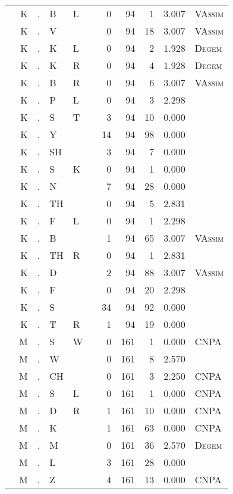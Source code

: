 \begin{longtable}{r@{ } r@{ } c@{ } l@{ } l@{ } l@{ } r r r r l }
 & K & . & B & L &  & 0 & 94 & 1 & 3.007 & \textsc{VAssim} \\
 & K & . & V &  &  & 0 & 94 & 18 & 3.007 & \textsc{VAssim} \\
 & K & . & K & L &  & 0 & 94 & 2 & 1.928 & \textsc{Degem} \\
 & K & . & K & R &  & 0 & 94 & 4 & 1.928 & \textsc{Degem} \\
 & K & . & B & R &  & 0 & 94 & 6 & 3.007 & \textsc{VAssim} \\
 & K & . & P & L &  & 0 & 94 & 3 & 2.298 &  \\
 & K & . & S & T &  & 3 & 94 & 10 & 0.000 &  \\
 & K & . & Y &  &  & 14 & 94 & 98 & 0.000 &  \\
 & K & . & SH &  &  & 3 & 94 & 7 & 0.000 &  \\
 & K & . & S & K &  & 0 & 94 & 1 & 0.000 &  \\
 & K & . & N &  &  & 7 & 94 & 28 & 0.000 &  \\
 & K & . & TH &  &  & 0 & 94 & 5 & 2.831 &  \\
 & K & . & F & L &  & 0 & 94 & 1 & 2.298 &  \\
 & K & . & B &  &  & 1 & 94 & 65 & 3.007 & \textsc{VAssim} \\
 & K & . & TH & R &  & 0 & 94 & 1 & 2.831 &  \\
 & K & . & D &  &  & 2 & 94 & 88 & 3.007 & \textsc{VAssim} \\
 & K & . & F &  &  & 0 & 94 & 20 & 2.298 &  \\
 & K & . & S &  &  & 34 & 94 & 92 & 0.000 &  \\
 & K & . & T & R &  & 1 & 94 & 19 & 0.000 &  \\
 & M & . & S & W &  & 0 & 161 & 1 & 0.000 & \textsc{CNPA} \\
 & M & . & W &  &  & 0 & 161 & 8 & 2.570 &  \\
 & M & . & CH &  &  & 0 & 161 & 3 & 2.250 & \textsc{CNPA} \\
 & M & . & S & L &  & 0 & 161 & 1 & 0.000 & \textsc{CNPA} \\
 & M & . & D & R &  & 1 & 161 & 10 & 0.000 & \textsc{CNPA} \\
 & M & . & K &  &  & 1 & 161 & 63 & 0.000 & \textsc{CNPA} \\
 & M & . & M &  &  & 0 & 161 & 36 & 2.570 & \textsc{Degem} \\
 & M & . & L &  &  & 3 & 161 & 28 & 0.000 &  \\
 & M & . & Z &  &  & 4 & 161 & 13 & 0.000 & \textsc{CNPA} \\

\end{longtable}
